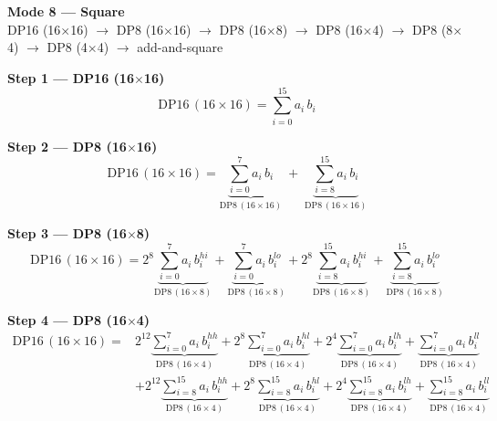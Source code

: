 \documentclass[fleqn]{article}
\newcommand{\DPop}[3]{\mathrm{DP#1}\,(#2\!\times\!#3)}
\begin{document}
\begin{center}
{\LARGE \textbf{Mode 8 --- Square}}\\[4pt]
{\large DP16 (16$\times$16) $\rightarrow$ DP8 (16$\times$16) $\rightarrow$ DP8 (16$\times$8) $\rightarrow$ DP8 (16$\times$4) $\rightarrow$ DP8 (8$\times$4) $\rightarrow$ DP8 (4$\times$4) $\rightarrow$ add-and-square}
\end{center}

\vspace{0.1em}

\textbf{Step 1 --- DP16 (16$\times$16)}
\[
\DPop{16}{16}{16} = \sum_{i=0}^{15} a_i \, b_i
\]

\textbf{Step 2 --- DP8 (16$\times$16)}
\[
\DPop{16}{16}{16}
  = \underbrace{\sum_{i=0}^{7} a_i \, b_i}_{\DPop{8}{16}{16}}
  \; + \; \underbrace{\sum_{i=8}^{15} a_i \, b_i}_{\DPop{8}{16}{16}}
\]

\textbf{Step 3 --- DP8 (16$\times$8)}
\[
\DPop{16}{16}{16}
  = 2^{8} \underbrace{\sum_{i=0}^{7} a_i \, b_i^{hi}}_{\DPop{8}{16}{8}}
  + \underbrace{\sum_{i=0}^{7} a_i \, b_i^{lo}}_{\DPop{8}{16}{8}}
  + 2^{8} \underbrace{\sum_{i=8}^{15} a_i \, b_i^{hi}}_{\DPop{8}{16}{8}}
  + \underbrace{\sum_{i=8}^{15} a_i \, b_i^{lo}}_{\DPop{8}{16}{8}}
\]

\textbf{Step 4 --- DP8 (16$\times$4)}
\begin{align*}
\DPop{16}{16}{16} = {}
  & 2^{12} \underbrace{\sum_{i=0}^{7} a_i \, b_i^{hh}}_{\DPop{8}{16}{4}}
  + 2^{8} \underbrace{\sum_{i=0}^{7} a_i \, b_i^{hl}}_{\DPop{8}{16}{4}}
  + 2^{4} \underbrace{\sum_{i=0}^{7} a_i \, b_i^{lh}}_{\DPop{8}{16}{4}}
  + \underbrace{\sum_{i=0}^{7} a_i \, b_i^{ll}}_{\DPop{8}{16}{4}} \\[1em]
  & + 2^{12} \underbrace{\sum_{i=8}^{15} a_i \, b_i^{hh}}_{\DPop{8}{16}{4}}
  + 2^{8} \underbrace{\sum_{i=8}^{15} a_i \, b_i^{hl}}_{\DPop{8}{16}{4}}
  + 2^{4} \underbrace{\sum_{i=8}^{15} a_i \, b_i^{lh}}_{\DPop{8}{16}{4}}
  + \underbrace{\sum_{i=8}^{15} a_i \, b_i^{ll}}_{\DPop{8}{16}{4}}
\end{align*}
\end{document}
